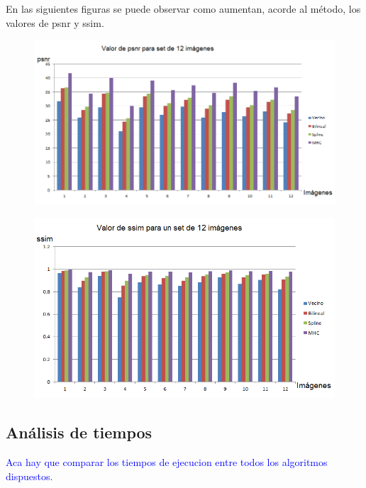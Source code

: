 \documentclass[a4paper]{article}
\begin{document}
\newpage
En las siguientes figuras se puede observar como aumentan, acorde al m\'etodo, los valores de psnr y ssim.
\begin{figure}[h!]
	\caption{}
	\begin{center}
	\includegraphics[scale=0.75]{imagenes/graficos/psnr}
	\label{cartel}
  \end{center}
\end{figure}

\begin{figure}[h!]
	\caption{}
	\begin{center}
	\includegraphics[scale=0.75]{imagenes/graficos/ssim}
	\label{cartel}
  \end{center}
\end{figure}

\newpage
\subsection{An\'alisis de tiempos}
\textcolor{blue}{Aca hay que comparar los tiempos de ejecucion entre todos los algoritmos dispuestos.}
\end{document}
